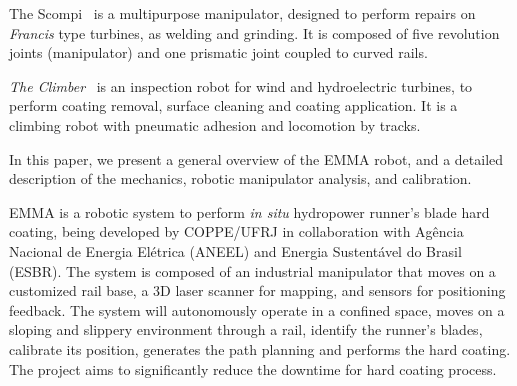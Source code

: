 The Scompi~\cite{scompi} is a multipurpose manipulator, designed to
perform repairs on \textit{Francis} type turbines, as welding and grinding. It
is composed of five revolution joints (manipulator) and one prismatic joint
coupled to curved rails.

\textit{The Climber}~\cite{icm} is an inspection robot for wind and
hydroelectric turbines, to perform coating removal, surface cleaning and
coating application. It is a climbing robot with pneumatic adhesion and
locomotion by tracks.

In this paper, we present a general overview of the EMMA robot, and a detailed
description of the mechanics, robotic manipulator analysis, and calibration.

EMMA is a robotic system to perform \textit{in situ} hydropower runner's
blade hard coating, being developed by COPPE/UFRJ in collaboration with Agência
Nacional de Energia Elétrica (ANEEL) and Energia Sustentável do Brasil (ESBR). The system
is composed of an industrial manipulator that moves on a customized rail base, a
3D laser scanner for mapping, and sensors for positioning feedback. The
system will autonomously operate in a confined space, moves on a sloping
and slippery environment through a rail, identify the runner's blades, calibrate
its position, generates the path planning and performs the hard coating. The
project aims to significantly reduce the downtime for hard coating process.

\begin{comment}
This text is organized as follows: a general overview of the robot and its main
challenges are presented in Section \ref{sec:general_overview}, detailed
descriptions of the embedded electronics, the vehicle support system, power
supply system, and software architecture are taken in
Sections \ref{sec:electronics_overview}, \ref{sec:powersupply_overview}, and
\ref{sec:software} respectively.
In Section \ref{sec:results}, preliminary results are shown, and concluding
remarks are drawn in Section \ref{sec:conclusions}.
\end{comment}